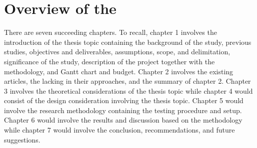 \fi


\section{Overview of the \documentType}

There are seven succeeding chapters. To recall, chapter 1 involves the introduction of the
thesis topic containing the background of the study, previous studies, objectives and
deliverables, assumptions, scope, and delimitation, significance of the study, description
of the project together with the methodology, and Gantt chart and budget. Chapter 2
involves the existing articles, the lacking in their approaches, and the summary of
chapter 2. Chapter 3 involves the theoretical considerations of the thesis topic while
chapter 4 would consist of the design consideration involving the thesis topic. Chapter 5
would involve the research methodology containing the testing procedure and setup.
Chapter 6 would involve the results and discussion based on the methodology while
chapter 7 would involve the conclusion, recommendations, and future suggestions.
